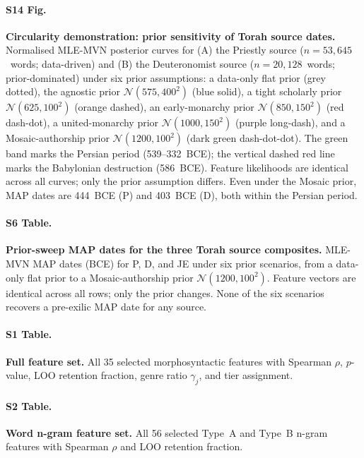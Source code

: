 \documentclass[10pt,letterpaper]{article}
\begin{document}
\paragraph*{S14 Fig.}
\label{S14_Fig}
\textbf{Circularity demonstration: prior sensitivity of Torah source dates.}
Normalised MLE-MVN posterior curves for (A) the Priestly source
($n=53{,}645$~words; data-driven) and (B) the Deuteronomist source
($n=20{,}128$~words; prior-dominated) under six prior assumptions: a
data-only flat prior (grey dotted), the agnostic prior
$\mathcal{N}(575,400^2)$ (blue solid), a tight scholarly prior
$\mathcal{N}(625,100^2)$ (orange dashed), an early-monarchy prior
$\mathcal{N}(850,150^2)$ (red dash-dot), a united-monarchy prior
$\mathcal{N}(1000,150^2)$ (purple long-dash), and a Mosaic-authorship
prior $\mathcal{N}(1200,100^2)$ (dark green dash-dot-dot).  The green
band marks the Persian period (539--332~BCE); the vertical dashed red
line marks the Babylonian destruction (586~BCE).  Feature likelihoods
are identical across all curves; only the prior assumption differs.
Even under the Mosaic prior, MAP dates are 444~BCE (P) and 403~BCE (D),
both within the Persian period.

\paragraph*{S6 Table.}
\label{S6_Table}
\textbf{Prior-sweep MAP dates for the three Torah source composites.}
MLE-MVN MAP dates (BCE) for P, D, and JE under six prior scenarios,
from a data-only flat prior to a Mosaic-authorship prior
$\mathcal{N}(1200,100^2)$.  Feature vectors are identical across all
rows; only the prior changes.  None of the six scenarios recovers a
pre-exilic MAP date for any source.

\paragraph*{S1 Table.}
\label{S1_Table}
\textbf{Full feature set.}
All 35 selected morphosyntactic features with Spearman $\rho$,
$p$-value, LOO retention fraction, genre ratio $\gamma_j$, and tier
assignment.

\paragraph*{S2 Table.}
\label{S2_Table}
\textbf{Word n-gram feature set.}
All 56 selected Type~A and Type~B n-gram features with Spearman $\rho$
and LOO retention fraction.
\end{document}
